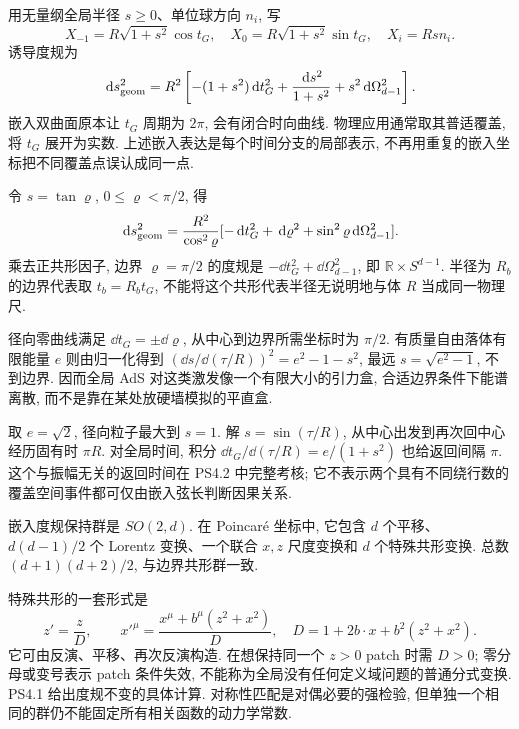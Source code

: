 用无量纲全局半径 $s\ge0$、单位球方向 $n_i$, 写
\[
X_{-1}=R\sqrt{1+s^2}\cos t_G,\quad
X_0=R\sqrt{1+s^2}\sin t_G,\quad
X_i=Rsn_i.
\]
诱导度规为
\[
\,\mathrm d s_{
\rm geom}^2=R^2\left[-(1+s^2)\,\mathrm d t_G^2+
\frac{\,\mathrm d s^2}{1+s^2}+s^2\,\mathrm d\Omega_{d-1}^2\right].
\]
嵌入双曲面原本让 $t_G$ 周期为 $2\pi$, 会有闭合时向曲线. 物理应用通常取其普适覆盖, 将 $t_G$ 展开为实数. 上述嵌入表达是每个时间分支的局部表示, 不再用重复的嵌入坐标把不同覆盖点误认成同一点.

令 $s=\tan\varrho$, $0\le\varrho<\pi/2$, 得
\[
\,\mathrm d s_{\rm geom}^2=\frac{R^2}{\cos^2\varrho}
[-\,\mathrm d t_G^2+\,\mathrm d\varrho^2+\sin^2\varrho\,\mathrm d\Omega_{d-1}^2].
\]
乘去正共形因子, 边界 $\varrho=\pi/2$ 的度规是 $-\dd t_G^2+\dd\Omega_{d-1}^2$, 即 $\mathbb R\times S^{d-1}$. 半径为 $R_b$ 的边界代表取 $t_b=R_bt_G$, 不能将这个共形代表半径无说明地与体 $R$ 当成同一物理尺.

径向零曲线满足 $\dd t_G=\pm\dd\varrho$, 从中心到边界所需坐标时为 $\pi/2$. 有质量自由落体有限能量 $e$ 则由归一化得到 $(\dd s/\dd(\tau/R))^2=e^2-1-s^2$, 最远 $s=\sqrt{e^2-1}$, 不到边界. 因而全局 AdS 对这类激发像一个有限大小的引力盒, 合适边界条件下能谱离散, 而不是靠在某处放硬墙模拟的平直盒.

\begin{example}
取 $e=\sqrt2$, 径向粒子最大到 $s=1$. 解 $s=\sin(\tau/R)$, 从中心出发到再次回中心经历固有时 $\pi R$. 对全局时间, 积分 $\dd t_G/\dd(\tau/R)=e/(1+s^2)$ 也给返回间隔 $\pi$. 这个与振幅无关的返回时间在 PS4.2 中完整考核; 它不表示两个具有不同绕行数的覆盖空间事件都可仅由嵌入弦长判断因果关系.
\end{example}

嵌入度规保持群是 $SO(2,d)$. 在 Poincaré 坐标中, 它包含 $d$ 个平移、$d(d-1)/2$ 个 Lorentz 变换、一个联合 $x,z$ 尺度变换和 $d$ 个特殊共形变换. 总数 $(d+1)(d+2)/2$, 与边界共形群一致.

特殊共形的一套形式是
\[
z'=\frac zD,\qquad x'^\mu=\frac{x^\mu+b^\mu(z^2+x^2)}D,
\quad D=1+2b\cdot x+b^2(z^2+x^2).
\]
它可由反演、平移、再次反演构造. 在想保持同一个 $z>0$ patch 时需 $D>0$; 零分母或变号表示 patch 条件失效, 不能称为全局没有任何定义域问题的普通分式变换. PS4.1 给出度规不变的具体计算. 对称性匹配是对偶必要的强检验, 但单独一个相同的群仍不能固定所有相关函数的动力学常数.
